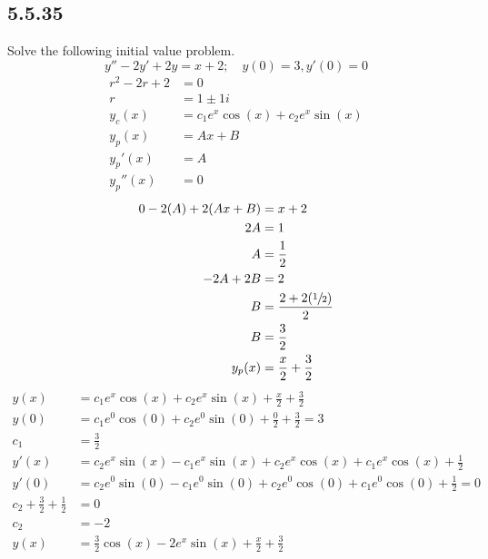 \documentclass{article}
\begin{document}
\subsection{5.5.35}
Solve the following initial value problem.
$$ y'' - 2y' + 2y = x + 2; \quad y(0) = 3, y'(0) = 0 $$
\begin{align*}
	r^2 - 2r + 2 & = 0 \\
	r & = 1 \pm 1i \\
	y_c(x) & = c_1e^x\cos(x) + c_2e^x\sin(x) \\
	y_p(x) & = Ax + B \\
	y_p'(x) & = A \\
	y_p''(x) & = 0
\end{align*}
\begin{align*}
	0 - 2(A) + 2(Ax + B) & = x + 2 \\
	2A & = 1 \\
	A & = \frac{1}{2} \\
	-2A + 2B & = 2 \\
	B & = \frac{2 + 2(\sfrac{1}{2})}{2} \\
	B & = \frac{3}{2} \\
	y_p(x) & = \frac{x}{2} + \frac{3}{2}
\end{align*}
\begin{align*}
	y(x) & = c_1e^x\cos(x) + c_2e^x\sin(x) + \frac{x}{2} + \frac{3}{2} \\
	y(0) & = c_1e^0\cos(0) + c_2e^0\sin(0) + \frac{0}{2} + \frac{3}{2} = 3 \\
	c_1 & = \frac{3}{2} \\
	y'(x) & = c_2e^x\sin(x) - c_1e^x\sin(x) + c_2e^x\cos(x) + c_1e^x\cos(x) + \frac{1}{2} \\
	y'(0) & = c_2e^0\sin(0) - c_1e^0\sin(0) + c_2e^0\cos(0) + c_1e^0\cos(0) + \frac{1}{2} = 0 \\
	c_2 + \frac{3}{2} + \frac{1}{2} & = 0 \\
	c_2 & = -2 \\
	y(x) & = \frac{3}{2}\cos(x) - 2e^x\sin(x) + \frac{x}{2} + \frac{3}{2}
\end{align*}
\end{document}

